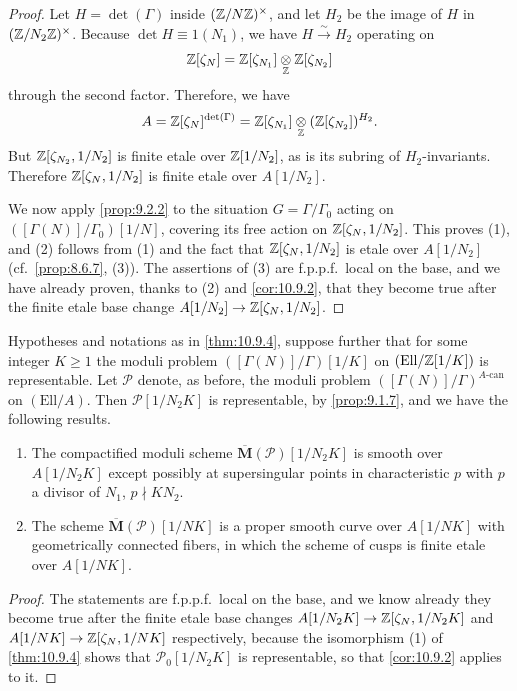 \begin{proof}
Let $H = \det(\Gamma)$ inside $(\mathbb{Z}/N\mathbb{Z})^\times$, and let $H_2$ be the image of $H$ in $(\mathbb{Z}/N_2\mathbb{Z})^\times$. Because $\det H \equiv 1(N_1)$, we have $H \xrightarrow{\sim} H_2$ operating on
\[
\mathbb{Z}[\zeta_N] = \mathbb{Z}[\zeta_{N_1}] \underset{\mathbb{Z}}{\otimes} \mathbb{Z}[\zeta_{N_2}]
\]
through the second factor. Therefore, we have
\[
A = \mathbb{Z}[\zeta_N]^{\det(\Gamma)} = \mathbb{Z}[\zeta_{N_1}] \underset{\mathbb{Z}}{\otimes} (\mathbb{Z}[\zeta_{N_2}])^{H_2} .
\]
But $\mathbb{Z}[\zeta_{N_2}, 1/N_2]$ is finite etale over $\mathbb{Z}[1/N_2]$, as is its subring of $H_2$-invariants. Therefore $\mathbb{Z}[\zeta_N, 1/N_2]$ is finite etale over $A[1/N_2]$.
\par
We now apply \eqref{prop:9.2.2} to the situation $G = \Gamma/\Gamma_0$ acting on $([\Gamma(N)]/\Gamma_0)[1/N]$, covering its free action on $\mathbb{Z}[\zeta_N, 1/N_2]$. This proves (1), and (2) follows from (1) and the fact that $\mathbb{Z}[\zeta_N, 1/N_2]$ is etale over $A[1/N_2]$ (cf.~\ref{prop:8.6.7}, (3)). The assertions of (3) are f.p.p.f.\ local on the base, and we have already proven, thanks to (2) and \eqref{cor:10.9.2}, that they become true after the finite etale base change $A[1/N_2] \to \mathbb{Z}[\zeta_N, 1/N_2]$.
\end{proof}

\begin{kcor}\label{cor:10.9.5}
Hypotheses and notations as in \eqref{thm:10.9.4}, suppose further that for some integer $K \ge 1$ the moduli problem $([\Gamma(N)]/\Gamma)[1/K]$ on $(\mathrm{Ell}/\mathbb{Z}[1/K])$ is representable. Let $\mathcal{P}$ denote, as before, the moduli problem $([\Gamma(N)]/\Gamma)^{A\text{-can}}$ on $(\mathrm{Ell}/A)$. Then $\mathcal{P}[1/N_2K]$ is representable, by \eqref{prop:9.1.7}, and we have the following results.
\begin{enumerate}[label=(\arabic*)]
\item The compactified moduli scheme $\overline{\mathbf{M}}(\mathcal{P})[1/N_2K]$ is smooth over $A[1/N_2K]$ except possibly at supersingular points in characteristic $p$ with $p$ a divisor of $N_1$, $p \nmid KN_2$.
\item The scheme $\overline{\mathbf{M}}(\mathcal{P})[1/NK]$ is a proper smooth curve over $A[1/NK]$ with geometrically connected fibers, in which the scheme of cusps is finite etale over $A[1/NK]$.
\end{enumerate}
\end{kcor}

\begin{proof}
The statements are f.p.p.f.\ local on the base, and we know already they become true after the finite etale base changes $A[1/N_2K] \to \mathbb{Z}[\zeta_N, 1/N_2K]$ and $A[1/NK] \to \mathbb{Z}[\zeta_N, 1/NK]$ respectively, because the isomorphism (1) of \eqref{thm:10.9.4} shows that $\mathcal{P}_0[1/N_2K]$ is representable, so that \eqref{cor:10.9.2} applies to it.
\end{proof}


